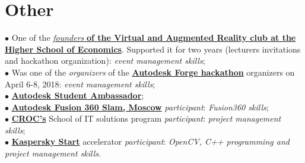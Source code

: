 \documentclass[]{cv-class}
\begin{document}
\begin{minipage}[t]{0.6\textwidth}
\section{Other}
    \textcolor{bullet_col}{$\bullet$} One of the \href{http://family.hse.ru/stud/view/391}{\textit{founders} \textbf{of the Virtual and Augmented Reality club at the Higher School of Economics}}. Supported it for two years (lecturers invitations and hackathon organization): \textit{event management skills}; \\
    \textcolor{bullet_col}{$\bullet$} Was one of the \textit{organizers} of the \href{https://www.hse.ru/ba/am/news/218387792.html}{\textbf{Autodesk Forge hackathon}} organizers on April 6-8, 2018: \textit{event management skills}; \\
    \textcolor{bullet_col}{$\bullet$} \href{https://academy.autodesk.com/users/n1kkys}{\textbf{Autodesk Student Ambassador}}; \\
    \textcolor{bullet_col}{$\bullet$} \href{https://youtu.be/k5R8RdXaOq4}{\textbf{Autodesk Fusion 360 Slam, Moscow}} \textit{participant}: \textit{Fusion360 skills}; \\
    \textcolor{bullet_col}{$\bullet$} \href{https://www.croc.ru/eng/}{\textbf{CROC's}} School of IT solutions program \textit{participant}: \textit{project management skills}; \\
    \textcolor{bullet_col}{$\bullet$} \href{https://kasperskystart.com}{\textbf{Kaspersky Start}} accelerator \textit{participant}: \textit{OpenCV, C++ programming and project management skills}.

\end{minipage}
\end{document}
